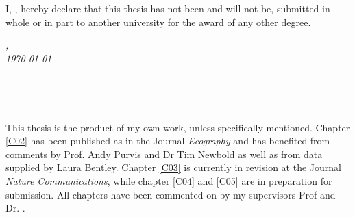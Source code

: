 %

\vspace*{5cm}

\begin{flushleft}
	\large{\noindent I, \myName, hereby declare that this thesis has not been and will not be, submitted in whole or in part to another university for the award of any other degree.}
\end{flushleft}

\vspace*{2cm}

\begin{minipage}{.45\linewidth}
	\begin{flushleft} %
		\textit{\myLocation,} \\
		\textit{\today}%
	\end{flushleft}
\end{minipage}
\hfill
\begin{minipage}{.45\linewidth}
	\begin{flushright} %
		\makebox[2.5in]{\hrulefill} \\
		\myName 
	\end{flushright}
\end{minipage}\\ [0.5cm]



\vspace*{5cm}

\begin{flushleft}
	\noindent This thesis is the product of my own work, unless specifically mentioned. 
	Chapter \ref{C02} has been published as \cite{Jung2018} in the Journal \textit{Ecography} and has benefited from comments by Prof. Andy Purvis and Dr Tim Newbold as well as from data supplied by Laura Bentley. Chapter \ref{C03} is currently in revision at the Journal \textit{Nature Communications}, while chapter \ref{C04} and \ref{C05} are in preparation for submission. All chapters have been commented on by my supervisors Prof \myProf and Dr. \myOtherProf.
\end{flushleft}

